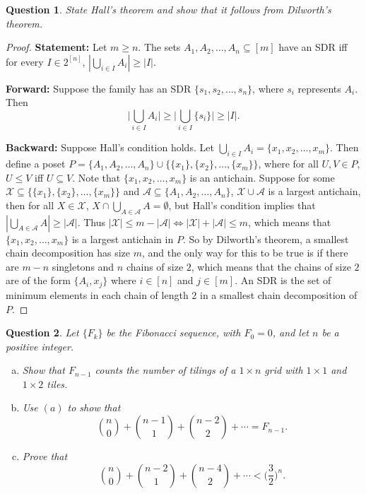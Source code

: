 \documentclass[12]{article}
\newtheorem{question}{Question}
\theoremstyle{definition}
\begin{document}
	\begin{question}
		State Hall's theorem and show that it follows from Dilworth's theorem.
	\end{question}
	\begin{proof}
		\textbf{Statement:} Let $m \geq n$.  The sets $A_1, A_2, \ldots, A_n \subseteq [m]$ have an SDR iff for every $I \in 2^{[n]}$, $|\bigcup_{i \in I}A_i| \geq |I|$.
		
		\textbf{Forward:} Suppose the family has an SDR $\{s_1, s_2, \ldots, s_n\}$, where $s_i$ represents $A_i$.  Then 
		$$\Big|\bigcup_{i \in I}A_i\Big| \geq \Big|\bigcup_{i \in I}\{s_i\}\Big| \geq |I|.$$
		
		\textbf{Backward:}   Suppose Hall's condition holds.  Let $\bigcup_{i \in I}A_i = \{x_1, x_2, \ldots, x_m\}$.  Then define a poset $P = \{A_1, A_2, \ldots, A_n\} \cup \{\{x_1\}, \{x_2\}, \ldots, \{x_m\}\}$, where for all $U, V \in P$, $U \leq V$ iff $U \subseteq V$.  Note that $\{x_1, x_2, \ldots, x_m\}$ is an antichain.  Suppose for some $\mathcal{X} \subseteq \{\{x_1\}, \{x_2\}, \ldots, \{x_m\}\}$ and $\mathcal{A} \subseteq \{A_1, A_2, \ldots, A_n\}$, $\mathcal{X} \cup \mathcal{A}$ is a largest antichain, then for all $X \in \mathcal{X}$, $X \cap \bigcup_{A \in \mathcal{A}}A = \emptyset$, but Hall's condition implies that $|\bigcup_{A \in \mathcal{A}}A| \geq |\mathcal{A}|$.  Thus $|\mathcal{X}| \leq m - |\mathcal{A}| \Leftrightarrow |\mathcal{X}| + |\mathcal{A}| \leq m$, which means that $\{x_1, x_2, \ldots, x_m\}$ is a largest antichain in $P$.  So by Dilworth's theorem, a smallest chain decomposition has size $m$, and the only way for this to be true is if there are $m-n$ singletons and $n$ chains of size $2$, which means that the chains of size $2$ are of the form $\{A_i,x_j\}$ where $i \in [n]$ and $j \in [m]$.  An SDR is the set of minimum elements in each chain of length $2$ in a smallest chain decomposition of $P$.
	\end{proof}

	\newpage
	
	\begin{question}
		Let $\{F_k\}$ be the Fibonacci sequence, with $F_0 = 0$, and let $n$ be a positive integer.
		\begin{enumerate}[a)]
			\item Show that $F_{n-1}$ counts the number of tilings of a $1 \times n$ grid with $1 \times 1$ and $1 \times 2$ tiles.
			\item Use $(a)$ to show that
			$${n \choose 0} + {n-1 \choose 1} + {n-2 \choose 2} + \cdots = F_{n-1}.$$
			\item Prove that
			$${n \choose 0} + {n-2 \choose 1} + {n - 4 \choose 2} + \cdots < \biggr(\frac{3}{2}\biggr)^n.$$
		\end{enumerate}
	\end{question}
\end{document}
